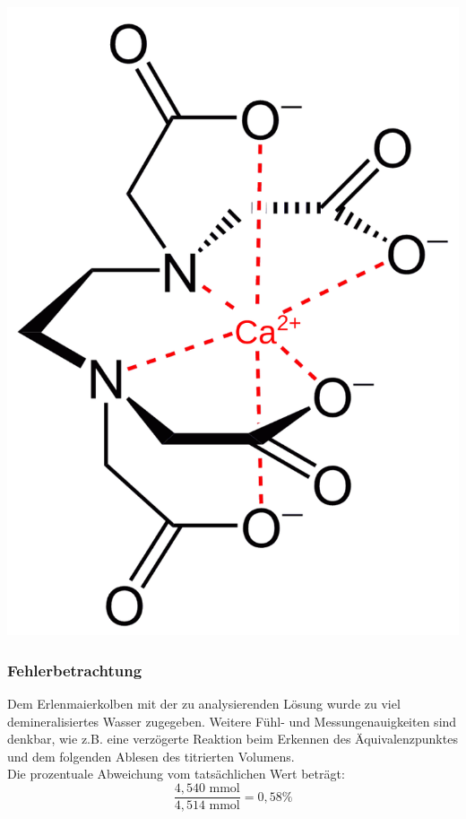 \documentclass{scrartcl}
\begin{document}
\begin{minipage}[t]{.45\textwidth}
		\centering
		\includegraphics[scale=.6]{ca-edta-komplex.png}
\end{minipage}
\subsubsection{Fehlerbetrachtung} Dem Erlenmaierkolben mit der zu analysierenden Lösung wurde zu viel demineralisiertes Wasser zugegeben. Weitere Fühl- und Messungenauigkeiten sind denkbar, wie z.B. eine verzögerte Reaktion beim Erkennen des Äquivalenzpunktes und dem folgenden Ablesen des titrierten Volumens. \\ 
Die prozentuale Abweichung vom tatsächlichen Wert beträgt:
\begin{equation}
	\frac{4,540\text{ mmol}}{4,514\text{ mmol}} = 0,58 \%
\end{equation}
\end{document}
